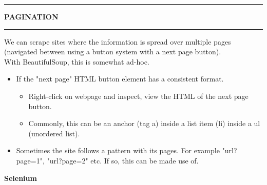\documentclass[8pt]{extarticle}
\newcommand{\heading}[1]{%
    \noindent
    \rule{\linewidth}{0.4pt}
    \begin{center}
        \vspace{-1ex}
        \textbf{#1}        
        \vspace{-2.5ex}
    \end{center}
    \rule{\linewidth}{0.4pt}
}
\begin{document}
\begin{multicols}{3}
\heading{PAGINATION}

We can scrape sites where the information is spread over multiple pages (navigated between using a button system with a next page button). \\

With BeautifulSoup, this is somewhat ad-hoc.\\

\begin{itemize}
    \item If the "next page" HTML button element has a consistent format.
    \begin{itemize}
        \item Right-click on webpage and inspect, view the HTML of the next page button. 
        \item Commonly, this can be an anchor (tag a) inside a list item (li) inside a ul (unordered list).
    \end{itemize}
    \item Sometimes the site follows a pattern with its pages. For example "{url}?page=1", "{url}?page=2" etc. If so, this can be made use of.
\end{itemize}


\newpage
\end{multicols}

\begin{center}
{\huge\textbf{Selenium}}
\vspace*{0.75cm}
\end{center}
\end{document}

